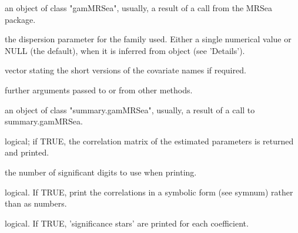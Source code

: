 \documentclass[a4paper]{book}
\begin{document}
\begin{Arguments}
\begin{ldescription}
\item[\code{object}] an object of class "gamMRSea", usually, a result of a call from the MRSea package.

\item[\code{dispersion}] the dispersion parameter for the family used. Either a single numerical value or NULL (the default), when it is inferred from object (see 'Details').

\item[\code{varshortnames}] vector stating the short versions of the covariate names if required.

\item[\code{...}] further arguments passed to or from other methods.

\item[\code{x}] an object of class "summary.gamMRSea", usually, a result of a call to summary.gamMRSea.

\item[\code{correlation}] logical; if TRUE, the correlation matrix of the estimated parameters is returned and printed.

\item[\code{digits}] the number of significant digits to use when printing.

\item[\code{symbolic.cor}] logical. If TRUE, print the correlations in a symbolic form (see symnum) rather than as numbers.

\item[\code{signif.stars}] logical. If TRUE, 'significance stars' are printed for each coefficient.
\end{ldescription}
\end{Arguments}
%
\end{document}
